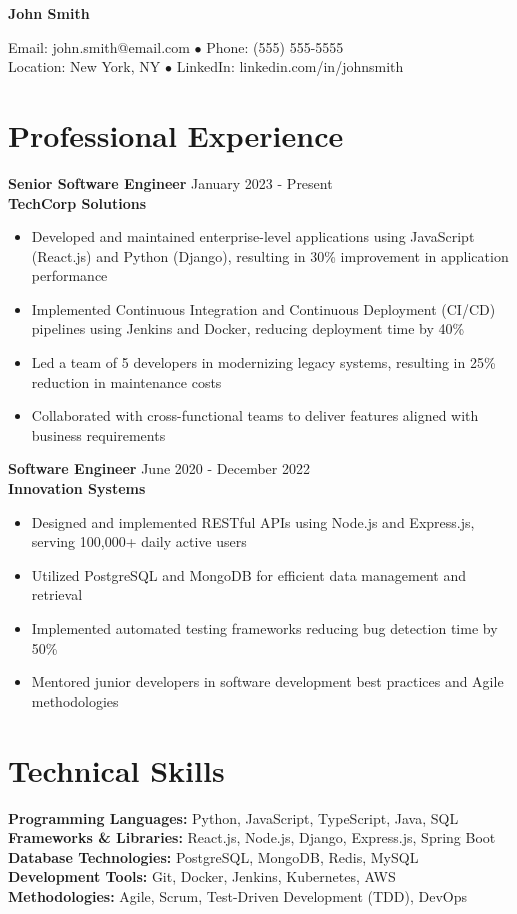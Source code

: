 \documentclass{classic}
\newcommand{\name}[1]{%
    \begin{center}
        {\Large\bfseries #1}
    \end{center}
}
\newcommand{\contactline}[4]{%
    \begin{center}
        #1 $\bullet$ #2\\
        #3 $\bullet$ #4
    \end{center}
}
\begin{document}
\name{John Smith}
\contactline{Email: john.smith@email.com}{Phone: (555) 555-5555}
{Location: New York, NY}{LinkedIn: linkedin.com/in/johnsmith}



\section{Professional Experience}

\textbf{Senior Software Engineer} \hfill January 2023 - Present\\
\textbf{TechCorp Solutions}
\begin{itemize}
    \item Developed and maintained enterprise-level applications using JavaScript (React.js) and Python (Django), resulting in 30\% improvement in application performance
    \item Implemented Continuous Integration and Continuous Deployment (CI/CD) pipelines using Jenkins and Docker, reducing deployment time by 40\%
    \item Led a team of 5 developers in modernizing legacy systems, resulting in 25\% reduction in maintenance costs
    \item Collaborated with cross-functional teams to deliver features aligned with business requirements
\end{itemize}

\textbf{Software Engineer} \hfill June 2020 - December 2022\\
\textbf{Innovation Systems}
\begin{itemize}
    \item Designed and implemented RESTful APIs using Node.js and Express.js, serving 100,000+ daily active users
    \item Utilized PostgreSQL and MongoDB for efficient data management and retrieval
    \item Implemented automated testing frameworks reducing bug detection time by 50\%
    \item Mentored junior developers in software development best practices and Agile methodologies
\end{itemize}

\section{Technical Skills}

\textbf{Programming Languages:} Python, JavaScript, TypeScript, Java, SQL\\
\textbf{Frameworks \& Libraries:} React.js, Node.js, Django, Express.js, Spring Boot\\
\textbf{Database Technologies:} PostgreSQL, MongoDB, Redis, MySQL\\
\textbf{Development Tools:} Git, Docker, Jenkins, Kubernetes, AWS\\
\textbf{Methodologies:} Agile, Scrum, Test-Driven Development (TDD), DevOps
\end{document}
